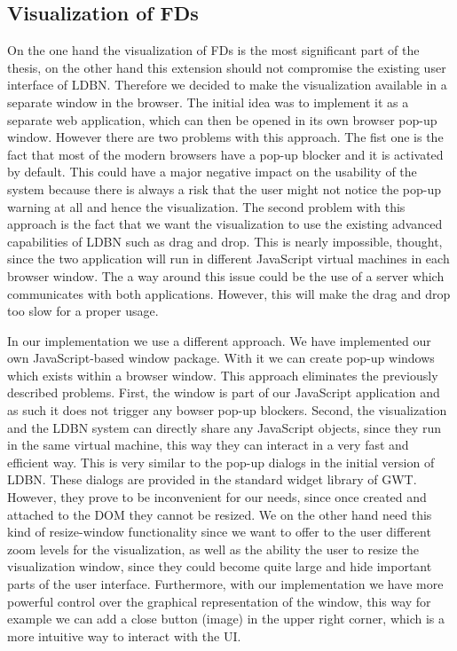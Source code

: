 \subsection{Visualization of FDs}
\label{sec:visualization}
On the one hand the visualization of FDs is the most significant 
part of the thesis, 
on the other hand this extension should not compromise the existing 
user interface of LDBN. Therefore we decided to
make the visualization available in a separate window in the browser. 
The initial idea
was to implement it as a separate web application, which can then be 
opened in its own 
browser pop-up window. However there are two problems with this approach. The fist one is
the fact that most of the modern browsers have a pop-up blocker and it is activated by default.
This could have a major negative impact on the usability of the system because there
is always a risk that the user might not notice the pop-up 
warning at all and hence the visualization. The second problem with this approach is 
the fact that we want the visualization to use the existing 
advanced capabilities of LDBN such as drag and drop. This is nearly impossible, thought, since
the two application will run in different JavaScript virtual machines in each
browser window. The a way around this issue could be the use of a server
which communicates with both applications. However, this will make the drag and drop too 
slow for a proper usage. 

In our implementation we use a different approach. We have implemented our own 
JavaScript-based window package.
With it we can create pop-up windows which exists within a browser window. 
This approach eliminates the previously described problems. First,
the window is part of our JavaScript application and as such it does not 
trigger any bowser pop-up
blockers. Second, the visualization and the LDBN system can directly share any 
JavaScript objects, since they run in the same virtual machine, 
this way they can interact in a very fast and efficient way. 
This is very similar to the pop-up dialogs in the initial version of LDBN. 
These dialogs are provided in the standard widget library of GWT. 
However, they prove to be inconvenient for our needs, since once created and attached 
to the DOM they cannot be resized. We on the other hand
need this kind of resize-window functionality since we want to offer to the user
different zoom levels for the visualization, as well as the ability the user to resize the
visualization window, since they could become quite large and hide important parts of the user 
interface. Furthermore, with our implementation we have more powerful control over
the graphical representation of the window, this way for example we can add a close button (image)
in the upper right corner, which is a more intuitive way to interact with the UI.

